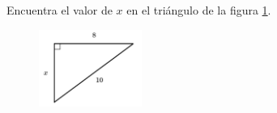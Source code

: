 \question[15]  Encuentra el valor de $x$ en el triángulo de la figura \ref{fig:lados_pitagoras_25}.
\begin{figure}[H]
    \begin{center}
        \includegraphics[width=0.3\textwidth]{../images/lados_pitagoras_25.png}
    \end{center}
    \caption{}
    \label{fig:lados_pitagoras_25}
\end{figure}